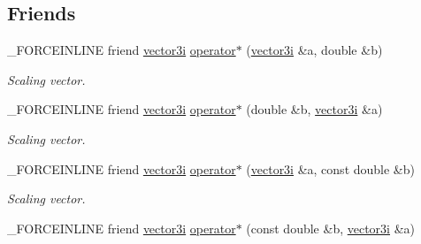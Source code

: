 \subsection*{Friends}
\begin{DoxyCompactItemize}
\item 
\hypertarget{classbt_1_1vector3i_aa4b8a6ad17a9c88d8ad7e1a31831dcfd}{\-\_\-\-F\-O\-R\-C\-E\-I\-N\-L\-I\-N\-E friend \hyperlink{classbt_1_1vector3i}{vector3i} \hyperlink{classbt_1_1vector3i_aa4b8a6ad17a9c88d8ad7e1a31831dcfd}{operator$\ast$} (\hyperlink{classbt_1_1vector3i}{vector3i} \&a, double \&b)}\label{classbt_1_1vector3i_aa4b8a6ad17a9c88d8ad7e1a31831dcfd}

\begin{DoxyCompactList}\small\item\em Scaling vector. \end{DoxyCompactList}\item 
\hypertarget{classbt_1_1vector3i_a0ad52f45e8e8bc1db787e2381f3ff874}{\-\_\-\-F\-O\-R\-C\-E\-I\-N\-L\-I\-N\-E friend \hyperlink{classbt_1_1vector3i}{vector3i} \hyperlink{classbt_1_1vector3i_a0ad52f45e8e8bc1db787e2381f3ff874}{operator$\ast$} (double \&b, \hyperlink{classbt_1_1vector3i}{vector3i} \&a)}\label{classbt_1_1vector3i_a0ad52f45e8e8bc1db787e2381f3ff874}

\begin{DoxyCompactList}\small\item\em Scaling vector. \end{DoxyCompactList}\item 
\hypertarget{classbt_1_1vector3i_a0c1a7cdc1f0d99a371a18c219d0e019e}{\-\_\-\-F\-O\-R\-C\-E\-I\-N\-L\-I\-N\-E friend \hyperlink{classbt_1_1vector3i}{vector3i} \hyperlink{classbt_1_1vector3i_a0c1a7cdc1f0d99a371a18c219d0e019e}{operator$\ast$} (\hyperlink{classbt_1_1vector3i}{vector3i} \&a, const double \&b)}\label{classbt_1_1vector3i_a0c1a7cdc1f0d99a371a18c219d0e019e}

\begin{DoxyCompactList}\small\item\em Scaling vector. \end{DoxyCompactList}\item 
\hypertarget{classbt_1_1vector3i_af15c6f668057a22ce2e419e6beeb604b}{\-\_\-\-F\-O\-R\-C\-E\-I\-N\-L\-I\-N\-E friend \hyperlink{classbt_1_1vector3i}{vector3i} \hyperlink{classbt_1_1vector3i_af15c6f668057a22ce2e419e6beeb604b}{operator$\ast$} (const double \&b, \hyperlink{classbt_1_1vector3i}{vector3i} \&a)}\label{classbt_1_1vector3i_af15c6f668057a22ce2e419e6beeb604b}


\end{DoxyCompactItemize}
